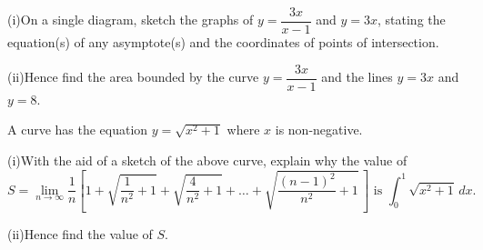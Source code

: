 \documentclass[a4paper,11pt]{book}
\begin{document}
\begin{parts}
\item[(a)] (i)\enspace On a single diagram, sketch the graphs of $y = \dfrac{3x}{x - 1}$ and $y = 3x$, stating the equation(s) of any asymptote(s) and the coordinates of points of intersection. 
\item[] (ii)\enspace Hence find the area bounded by the curve $y = \dfrac{3x}{x - 1}$ and the lines $y = 3x$ and $y = 8$. 
\item[(b)] A curve has the equation $y = \sqrt{x^2 + 1}$ where $x$ is non-negative.
\item[] (i)\enspace With the aid of a sketch of the above curve, explain why the value of
\[ S = \lim_{n\to\infty} \dfrac{1}{n}\left[1 + \sqrt{\dfrac{1}{n^2} + 1} + \sqrt{\dfrac{4}{n^2} + 1} + \ldots + \sqrt{\dfrac{(n - 1)^2}{n^2} + 1}\,\right] \text{ is } \int_0^1 \sqrt{x^2 + 1}\,dx. \]
\item[] (ii)\enspace Hence find the value of $S$. 
\end{parts}
\end{document}
